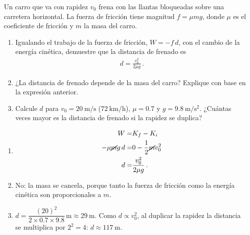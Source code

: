 \documentclass[12pt, a4paper]{article}
\begin{document}
\begin{exercise}[ID=frenado, tags={banco}]
Un carro que va con rapidez $v_0$ frena con las llantas bloqueadas sobre una carretera horizontal. La fuerza de fricción tiene magnitud $f=\mu m g$, donde $\mu$ es el coeficiente de fricción y $m$ la masa del carro.
\begin{enumerate}
    \item Igualando el trabajo de la fuerza de fricción, $W=-f\,d$, con el cambio de la energía cinética, demuestre que la distancia de frenado es
    \begin{align*}
        d = \frac{v_0^2}{2\mu g}\,.
    \end{align*}
    \item ¿La distancia de frenado depende de la masa del carro? Explique con base en la expresión anterior.
    \item Calcule $d$ para $v_0=\qty{20}{\m/\s}$ ($\qty{72}{\km/\hour}$), $\mu = 0.7$ y $g=\qty{9.8}{\m/\s^2}$. ¿Cuántas veces mayor es la distancia de frenado si la rapidez se duplica?
\end{enumerate}
\end{exercise}
\begin{solution}
\begin{enumerate}
    \item
    \begin{align}
        W =& K_f - K_i\nonumber\\
        -\mu \cancel{m} g\, d =& 0-\frac{1}{2}\cancel{m}v_0^2\nonumber\\
        d =& \frac{v_0^2}{2\mu g}\,.
    \end{align}
    \item No: la masa se cancela, porque tanto la fuerza de fricción como la energía cinética son proporcionales a $m$.
    \item $d = \dfrac{(20)^2}{2\times 0.7\times 9.8}\,\unit{\m} \approx \qty{29}{\m}$. Como $d\propto v_0^2$, al duplicar la rapidez la distancia se multiplica por $2^2=4$: $d\approx\qty{117}{\m}$.
\end{enumerate}
\end{solution}
\end{document}
